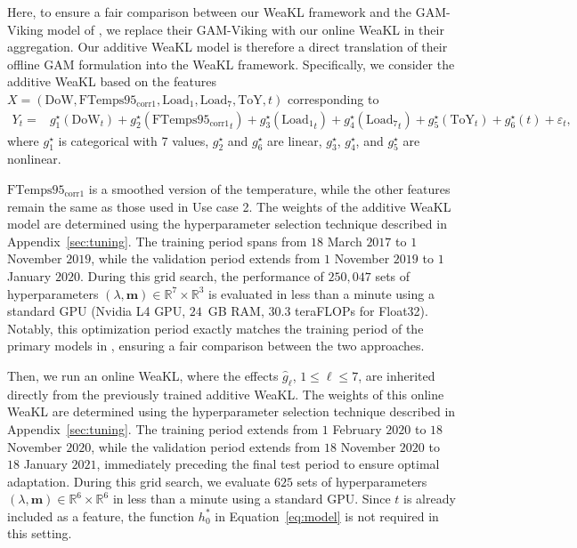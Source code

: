 Here, to ensure a fair comparison between our WeaKL framework and the GAM-Viking model of \citet{vilmarest2022state}, we replace their GAM-Viking with our online WeaKL in their aggregation. Our additive WeaKL model is therefore a direct translation of their offline GAM formulation into the WeaKL framework. Specifically, we consider the additive WeaKL based on the features $X = (\mathrm{DoW}, \mathrm{FTemps95_{corr1}}, \mathrm{Load_1}, \mathrm{Load_7}, \mathrm{ToY}, t)$ corresponding to
\begin{equation*}
\begin{split} 
Y_t =& g_1^\star(\mathrm{DoW}_t)
   +g_2^\star(\mathrm{FTemps95_{corr1}}_t)
   + g_3^\star(\mathrm{Load_1}_t) +g_4^\star(\mathrm{Load_7}_t)+g_5^\star(\mathrm{ToY}_t)
      +g_6^\star(t) +\varepsilon_t,
\end{split}
\end{equation*}
where $g_1^\star$ is categorical with 7 values, $g_2^\star$ and $g_6^\star$  are linear,  $g_3^\star$, $g_4^\star$, and $g_5^\star$ are nonlinear.

$\mathrm{FTemps95_{corr1}}$ is a smoothed version of the temperature, while the other features remain the same as those used in Use case 2. The weights of the additive WeaKL model are determined using the hyperparameter selection technique described in Appendix~\ref{sec:tuning}. 
The training period spans from $18$ March $2017$ to $1$ November $2019$, while the validation period extends from $1$ November $2019$ to $1$ January $2020$. 
During this grid search, the performance of $250,047$ sets of hyperparameters $(\lambda, \mathbf m)\in \mathbb R^7\times \mathbb R^3$ is evaluated in less than a minute using a standard GPU (Nvidia L4 GPU, $24$~GB RAM, $30.3$ teraFLOPs for Float32). 
Notably, this optimization period exactly matches the training period of the primary models in \citet{vilmarest2022state}, ensuring a fair comparison between the two approaches.

Then, we run an online WeaKL, where the effects $\hat g_\ell$, $1\leq \ell \leq 7$, are inherited directly from the previously trained additive WeaKL. 
The weights of this online WeaKL are determined using the hyperparameter selection technique described in Appendix~\ref{sec:tuning}. 
The training period extends from $1$ February $2020$ to $18$ November $2020$, while the validation period extends from $18$ November $2020$ to $18$ January $2021$, immediately preceding the final test period to ensure optimal adaptation. During this grid search, we evaluate $625$ sets of hyperparameters $(\lambda, \mathbf m)\in \mathbb R^6\times \mathbb R^6$ in less than a minute using a standard GPU. 
Since $t$ is already included as a feature, the function  $h_0^\ast$ in Equation~\eqref{eq:model} is not required in this setting.

